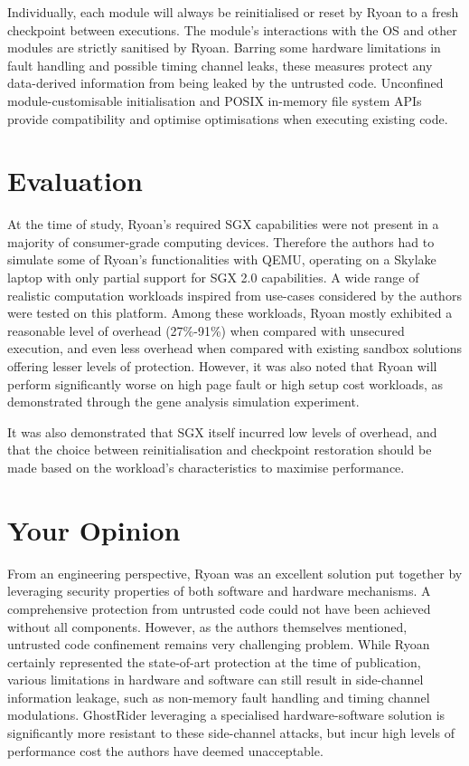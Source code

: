 \documentclass[11pt]{article}
\begin{document}
Individually, each module will always be reinitialised or reset by Ryoan to a fresh checkpoint between executions. The module's interactions with the OS and other modules are strictly sanitised by Ryoan. Barring some hardware limitations in fault handling and possible timing channel leaks, these measures protect any data-derived information from being leaked by the untrusted code. Unconfined module-customisable initialisation and POSIX in-memory file system APIs provide compatibility and optimise optimisations when executing existing code.

\section*{Evaluation}

At the time of study, Ryoan's required SGX capabilities were not present in a majority of consumer-grade computing devices. Therefore the authors had to simulate some of Ryoan's functionalities with QEMU, operating on a Skylake laptop with only partial support for SGX 2.0 capabilities. A wide range of realistic computation workloads inspired from use-cases considered by the authors were tested on this platform. Among these workloads, Ryoan mostly exhibited a reasonable level of overhead (27\%-91\%) when compared with unsecured execution, and even less overhead when compared with existing sandbox solutions offering lesser levels of protection. However, it was also noted that Ryoan will perform significantly worse on high page fault or high setup cost workloads, as demonstrated through the gene analysis simulation experiment. 

It was also demonstrated that SGX itself incurred low levels of overhead, and that the choice between reinitialisation and checkpoint restoration should be made based on the workload's characteristics to maximise performance.

\section*{Your Opinion}

From an engineering perspective, Ryoan was an excellent solution put together by leveraging security properties of both software and hardware mechanisms. A comprehensive protection from untrusted code could not have been achieved without all components. However, as the authors themselves mentioned, untrusted code confinement remains very challenging problem. While Ryoan certainly represented the state-of-art protection at the time of publication, various limitations in hardware and software can still result in side-channel information leakage, such as non-memory fault handling and timing channel modulations. GhostRider \cite{liu2015ghostrider} leveraging a specialised hardware-software solution is significantly more resistant to these side-channel attacks, but incur high levels of performance cost the authors have deemed unacceptable.
\end{document}
